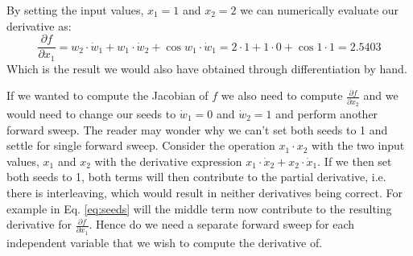 	By setting the input values, $x_1 = 1$ and $x_2 = 2$ we can numerically evaluate
	our derivative as:
	\begin{equation}
	\frac{\partial f}{\partial x_1} = w_2 \cdot \dot{w}_1 + w_1 \cdot \dot{w}_2 +
	\cos w_1  \cdot  \dot{w}_1 =  2 \cdot 1 + 1 \cdot 0 + \cos 1 \cdot 1 = 2.5403
	\label{eq:seeds}
	\end{equation}
	Which is the result we would also have obtained through differentiation by hand.

	If we wanted to compute the Jacobian of $f$ we also need to compute
	$\frac{\partial f}{\partial x_2}$
	and we would need to change our seeds to $\dot{w}_1 = 0$ and $\dot{w}_2 = 1$
	and perform another forward sweep.
	The reader may wonder why we can't set both seeds to 1 and settle for single
	forward sweep.
	Consider the operation $x_1 \cdot x_2$ with the two input values, $x_1$ and
	$x_2$ with the derivative expression
	$x_1 \cdot \dot{x}_2 + x_2 \cdot \dot{x}_1$. If we then set both seeds to 1,
	both terms will then contribute to
	the partial derivative, i.e. there is interleaving, which would result in
	neither derivatives being correct. For example in Eq. \ref{eq:seeds}
	will the middle term now contribute to the resulting derivative for
	$\frac{\partial f}{\partial x_1}$. Hence do we need a separate forward sweep for
	each
	independent variable that we wish to compute the derivative of.
